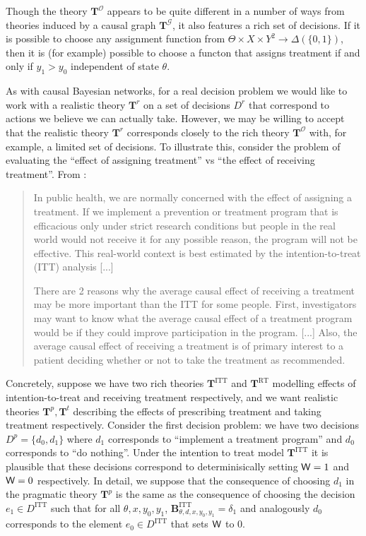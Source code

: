 Though the theory $\mathbf{T}^{\mathscr{O}}$ appears to be quite different in a number of ways from theories induced by a causal graph $\mathbf{T}^\mathcal{G}$, it also features a rich set of decisions. If it is possible to choose any assignment function from $\Theta\times X\times Y^2\to\Delta(\{0,1\})$, then it is (for example) possible to choose a functon that assigns treatment if and only if $y_1 > y_0$ independent of state $\theta$.

As with causal Bayesian networks, for a real decision problem we would like to work with a realistic theory $\mathbf{T}^r$ on a set of decisions $D^r$ that correspond to actions we believe we can actually take. However, we may be willing to accept that the realistic theory $\mathbf{T}^r$ corresponds closely to the rich theory $\mathbf{T}^\mathscr{O}$ with, for example, a limited set of decisions. To illustrate this, consider the problem of evaluating the ``effect of assigning treatment'' vs ``the effect of receiving treatment''. From \citet{shrier_intention--treat_2017}:

\begin{quote}
In public health, we are normally concerned with the effect of assigning a treatment. If we implement a prevention or treatment program that is efficacious only under strict research conditions but people in the real world would not receive it for any possible reason, the program will not be effective. This real-world context is best estimated by the intention-to-treat (ITT) analysis [...]

There are 2 reasons why the average causal effect of receiving a treatment may be more important than the ITT for some people. First, investigators may want to know what the average causal effect of a treatment program would be if they could improve participation in the program. [...] Also, the average causal effect of receiving a treatment is of primary interest to a patient deciding whether or not to take the treatment as recommended.
\end{quote}

Concretely, suppose we have two rich theories $\mathbf{T}^{\mathrm{ITT}}$ and $\mathbf{T}^{\mathrm{RT}}$ modelling effects of intention-to-treat and receiving treatment respectively, and we want realistic theories $\mathbf{T}^p,\mathbf{T}^t$ describing the effects of prescribing treatment and taking treatment respectively. Consider the first decision problem: we have two decisions $D^p=\{d_0,d_1\}$ where $d_1$ corresponds to ``implement a treatment program'' and $d_0$ corresponds to ``do nothing''. Under the intention to treat model $\mathbf{T}^{\mathrm{ITT}}$ it is plausible that these decisions correspond to determinisically setting $\mathsf{W}=1$ and $\mathsf{W}=0$ respectively. In detail, we suppose that the consequence of choosing $d_1$ in the pragmatic theory $\mathbf{T}^p$ is the same as the consequence of choosing the decision $e_1\in D^{\mathrm{ITT}}$ such that for all $\theta,x,y_0,y_1$, $\mathbf{B}^{\mathrm{ITT}}_{\theta,d,x,y_0,y_1} = \delta_1$ and analogously $d_0$ corresponds to the element $e_0\in D^{\mathrm{ITT}}$ that sets $\mathsf{W}$ to 0.

